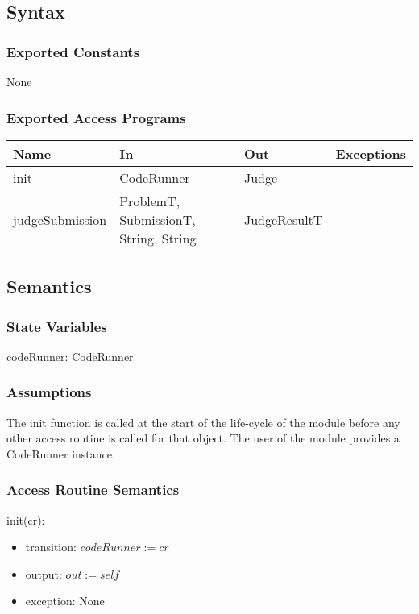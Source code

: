 \documentclass[12pt, titlepage]{article}
\begin{document}
\subsection{Syntax}

\subsubsection{Exported Constants}
None

\subsubsection{Exported Access Programs}

\begin{center}
\begin{tabular}{p{4cm} p{4cm} p{4cm} p{2cm}}
\hline
\textbf{Name} & \textbf{In} & \textbf{Out} & \textbf{Exceptions} \\
\hline
init & CodeRunner & Judge & \\
judgeSubmission & ProblemT, SubmissionT, String, String  & JudgeResultT & \\
\hline
\end{tabular}
\end{center}

\subsection{Semantics}

\subsubsection{State Variables}

codeRunner: CodeRunner

\subsubsection{Assumptions}

The init function is called at the start of the life-cycle of the module before any other access routine is called for that object. The user of the module provides a CodeRunner instance.

\subsubsection{Access Routine Semantics}

\noindent init(cr):
\begin{itemize}
\item transition: $codeRunner := cr$
\item output: $out := self$
\item exception: None
\end{itemize}
\end{document}
